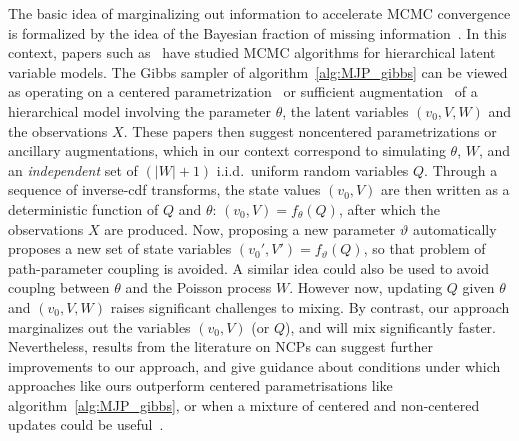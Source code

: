 The basic idea of marginalizing out information to accelerate MCMC convergence is formalized by the idea of the Bayesian fraction of missing information~\citep{liu1994fraction}. 
In this context, papers such as~\citet{papaspiliopoulos2007general,yu2011center} have studied MCMC algorithms for hierarchical latent variable models. 
The Gibbs sampler of algorithm~\ref{alg:MJP_gibbs} can be viewed as operating on a centered parametrization~\citep{papaspiliopoulos2007general} or sufficient augmentation~\citep{yu2011center} of a hierarchical model involving the parameter $\theta$, the latent variables $(v_0, V, W)$ and the observations $X$. 
These papers then suggest noncentered parametrizations or ancillary augmentations, which in our context correspond to simulating $\theta$, $W$, and an {\em independent} set of $(|W|+1)$ i.i.d.\ uniform random variables $Q$. 
Through a sequence of inverse-cdf transforms, the state values $(v_0,V)$ are then written as a deterministic function of $Q$ and $\theta$: $(v_0,V) = f_\theta(Q)$, after which the observations $X$ are produced. 
Now, proposing a new parameter $\vartheta$ automatically proposes a new set of state variables $(v_0',V') = f_\vartheta(Q)$, so that problem of path-parameter coupling is avoided.
A similar idea could also be used to avoid couplng between $\theta$ and the Poisson process $W$.
However now, updating $Q$ given $\theta$ and $(v_0, V, W)$ raises significant challenges to mixing.
By contrast, our approach marginalizes out the variables $(v_0,V)$ (or $Q$), and will mix significantly faster.
Nevertheless, results from the literature on NCPs can suggest further improvements to our approach, and give guidance about conditions under which 
approaches like ours outperform centered parametrisations like algorithm~\ref{alg:MJP_gibbs}, or when a mixture of centered and non-centered
updates could be useful~\citep{yu2011center}.


